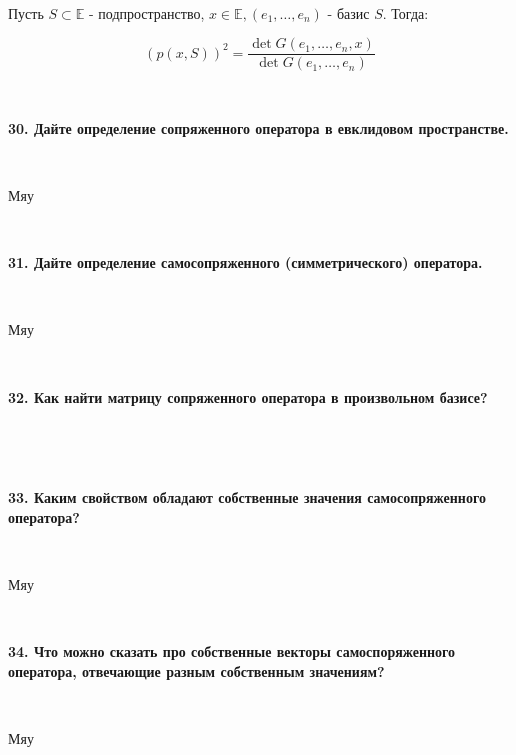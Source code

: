 \documentclass{article}
\begin{document}
    {
        $\;$
        \setlength{\parindent}{0.4cm}
        \hangindent=0.4cm

    Пусть $S \subset \mathbb{E}$ - подпространство, $x \in \mathbb{E}, (e_1, \dots, e_n)$ - базис $S$. Тогда:

        $$
        (p(x, S))^2 = \frac{\det G(e_1,\dots, e_n, x)}{\det G(e_1, \dots, e_n)}
        $$

        $\;$
        \setlength{\parindent}{0cm}
        \hangindent=0cm
    }

    \textbf{30. Дайте определение сопряженного оператора в евклидовом пространстве.}

    {
        $\;$
        \setlength{\parindent}{0.4cm}
        \hangindent=0.4cm

        Мяу

        $\;$
        \setlength{\parindent}{0cm}
        \hangindent=0cm
    }

    \textbf{31. Дайте определение самосопряженного (симметрического) оператора.}

    {
        $\;$
        \setlength{\parindent}{0.4cm}
        \hangindent=0.4cm

        Мяу

        $\;$
        \setlength{\parindent}{0cm}
        \hangindent=0cm
    }

    \textbf{32. Как найти матрицу сопряженного оператора в произвольном базисе?}

    {
        $\;$
        \setlength{\parindent}{0.4cm}
        \hangindent=0.4cm



        $\;$
        \setlength{\parindent}{0cm}
        \hangindent=0cm
    }

    \textbf{33. Каким свойством обладают собственные значения самосопряженного оператора?}

    {
        $\;$
        \setlength{\parindent}{0.4cm}
        \hangindent=0.4cm

        Мяу

        $\;$
        \setlength{\parindent}{0cm}
        \hangindent=0cm
    }

    \textbf{34. Что можно сказать про собственные векторы самоспоряженного оператора, отвечающие разным собственным значениям?}

    {
        $\;$
        \setlength{\parindent}{0.4cm}
        \hangindent=0.4cm

        Мяу

        $\;$
        \setlength{\parindent}{0cm}
        \hangindent=0cm
    }
\end{document}
